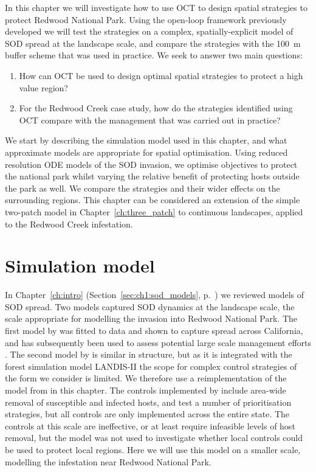 In this chapter we will investigate how to use OCT to design spatial strategies to protect Redwood National Park. Using the open-loop framework previously developed we will test the strategies on a complex, spatially-explicit model of SOD spread at the landscape scale, and compare the strategies with the \SI{100}{\meter} buffer scheme that was used in practice. We seek to answer two main questions:
\begin{enumerate}
    \item How can OCT be used to design optimal spatial strategies to protect a high value region?
    \item For the Redwood Creek case study, how do the strategies identified using OCT compare with the management that was carried out in practice?
\end{enumerate}

We start by describing the simulation model used in this chapter, and what approximate models are appropriate for spatial optimisation. Using reduced resolution ODE models of the SOD invasion, we optimise objectives to protect the national park whilst varying the relative benefit of protecting hosts outside the park as well. We compare the strategies and their wider effects on the surrounding regions. This chapter can be considered an extension of the simple two-patch model in Chapter~\ref{ch:three_patch} to continuous landscapes, applied to the Redwood Creek infestation.

\section{Simulation model}

In Chapter~\ref{ch:intro} (Section~\ref{sec:ch1:sod_models}, p.~\pageref{sec:ch1:sod_models}) we reviewed models of SOD spread. Two models captured SOD dynamics at the landscape scale, the scale appropriate for modelling the invasion into Redwood National Park. The first model by \citet{meentemeyer_epidemiological_2011} was fitted to data and shown to capture spread across California, and has subsequently been used to assess potential large scale management efforts \citep{cunniffe_modelling_2016}. The second model by \citet{tonini_modeling_2018} is similar in structure, but as it is integrated with the forest simulation model LANDIS-II \citep{scheller_design_2007} the scope for complex control strategies of the form we consider is limited. We therefore use a reimplementation of the model from \citet{meentemeyer_epidemiological_2011} in this chapter. The controls implemented by \citet{cunniffe_modelling_2016} include area-wide removal of susceptible and infected hosts, and test a number of prioritisation strategies, but all controls are only implemented across the entire state. The controls at this scale are ineffective, or at least require infeasible levels of host removal, but the model was not used to investigate whether local controls could be used to protect local regions. Here we will use this model on a smaller scale, modelling the infestation near Redwood National Park.

